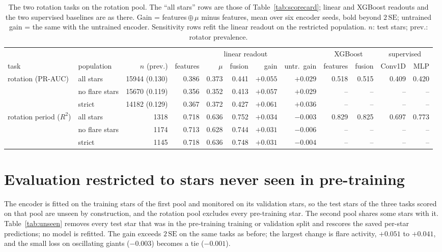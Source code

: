 \documentclass{article}
\begin{document}
\begin{table}[H]
\caption{The two rotation tasks on the rotation pool. The ``all stars'' rows are those of
Table~\ref{tab:scorecard}; linear and XGBoost readouts and the two supervised baselines are as there.
Gain = features\,$\oplus\,\mu$ minus features, mean over six encoder seeds, bold beyond
$2\,\mathrm{SE}$; untrained gain = the same with the untrained encoder. Sensitivity rows refit the
linear readout on the restricted population. $n$: test stars; prev.: rotator prevalence.}
\label{tab:rotpool}
\centering
\scriptsize
\setlength{\tabcolsep}{2.5pt}
\begin{tabular}{llrrrrrrrrrr}
\toprule
 & & & \multicolumn{5}{c}{linear readout} & \multicolumn{2}{c}{XGBoost} & \multicolumn{2}{c}{supervised} \\
\cmidrule(lr){4-8}\cmidrule(lr){9-10}\cmidrule(lr){11-12}
task & population & $n$ (prev.) & features & $\mu$ & fusion & gain & untr.\ gain & features & fusion & Conv1D & MLP \\
\midrule
rotation (PR-AUC) & all stars & 15944 (0.130) & 0.386 & 0.373 & 0.441 & $\mathbf{+0.055}$ & $+0.029$ & 0.518 & 0.515 & 0.409 & 0.420 \\
 & \quad no flare stars & 15670 (0.119) & 0.356 & 0.352 & 0.413 & $\mathbf{+0.057}$ & $+0.029$ & -- & -- & -- & -- \\
 & \quad strict & 14182 (0.129) & 0.367 & 0.372 & 0.427 & $\mathbf{+0.061}$ & $+0.036$ & -- & -- & -- & -- \\
\midrule
rotation period ($R^2$) & all stars & 1318 & 0.718 & 0.636 & 0.752 & $\mathbf{+0.034}$ & $-0.003$ & 0.829 & 0.825 & 0.697 & 0.773 \\
 & \quad no flare stars & 1174 & 0.713 & 0.628 & 0.744 & $\mathbf{+0.031}$ & $-0.006$ & -- & -- & -- & -- \\
 & \quad strict & 1145 & 0.718 & 0.636 & 0.748 & $\mathbf{+0.031}$ & $-0.004$ & -- & -- & -- & -- \\
\bottomrule
\end{tabular}

\end{table}

\section{Evaluation restricted to stars never seen in pre-training}
\label{app:unseen}

The encoder is fitted on the training stars of the first pool and monitored on its validation stars,
so the test stars of
the three tasks scored on that pool are unseen by construction, and the rotation pool excludes every
pre-training star. The second pool shares some stars with
it. Table~\ref{tab:unseen} removes every test star that was in the pre-training training or validation
split and rescores the saved per-star predictions; no model is refitted. The gain exceeds
$2\,\mathrm{SE}$ on the same tasks as before; the largest change is flare activity, $+0.051$ to
$+0.041$, and the small loss on oscillating giants ($-0.003$) becomes a tie ($-0.001$).
\end{document}
